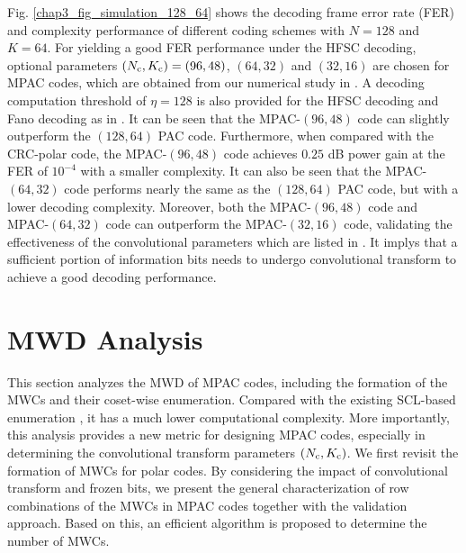 \documentclass[12pt, draftclsnofoot, peerreview, onecolumn]{IEEEtran}
\theoremstyle{noparent}
\begin{document}
Fig. \ref{chap3_fig_simulation_128_64} shows the decoding frame error rate (FER) and complexity performance of 
different coding schemes with $N=128$ and $K=64$. 
For yielding a good FER performance under the HFSC decoding,
optional parameters $(N_{\rm c}, K_{\rm c})=(96, 48)$, $(64, 32)$ and $(32, 16)$ are chosen for MPAC codes, which are obtained from our numerical study in \cite{Cai2023ModifiedPACCodes}.
A decoding computation threshold of $\eta=128$ is also provided for the HFSC decoding and Fano decoding as in \cite{Cai2023ModifiedPACCodes}. 
It can be seen that the MPAC-$(96,48)$ code can slightly outperform the $(128, 64)$ PAC code. 
Furthermore, when compared with the CRC-polar code, 
the MPAC-$(96,48)$ code achieves $0.25$ dB power gain at the FER of $10^{-4}$ 
with a smaller complexity.
It can also be seen that the MPAC-$(64,32)$ code performs nearly the same as 
the $(128, 64)$ PAC code, but with a lower decoding complexity.
Moreover, both the MPAC-$(96,48)$ code and MPAC-$(64,32)$ code can outperform the 
MPAC-$(32,16)$ code, validating the effectiveness of the convolutional 
parameters which are listed in \cite{Cai2023ModifiedPACCodes}.
It implys that a sufficient portion of information bits needs to undergo convolutional transform to achieve a good decoding performance.



\section{MWD Analysis}
\label{sec4}
This section analyzes the MWD of MPAC codes, 
including the formation of the MWCs and their coset-wise enumeration. 
Compared with the existing SCL-based enumeration \cite{Li2012AdaptiveSuccessiveCancellation},
it has a much lower computational complexity.
More importantly, this analysis provides a new
metric for designing MPAC codes, especially in determining the convolutional transform
parameters $(N_{\rm c}, K_{\rm c})$.        
We first revisit the formation of MWCs for polar codes.
By considering the impact of convolutional transform and frozen bits,
we present the general characterization of row combinations 
of the MWCs in MPAC codes together with the validation approach.
Based on this, an efficient algorithm is proposed to 
determine the number of MWCs.
\end{document}
